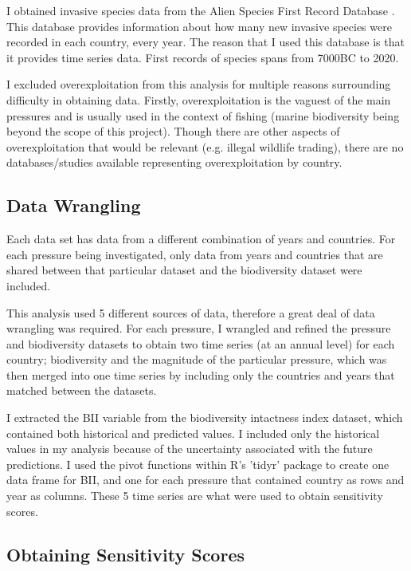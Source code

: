 \documentclass[11pt, a4paper, titlepage]{article}
\begin{document}
	I obtained invasive species data from the Alien Species First Record Database \citep{seebens2017no, seebens2018global}. This database provides information about how many new invasive species were recorded in each country, every year. The reason that I used this database is that it provides time series data. First records of species spans from 7000BC to 2020.  
	
	I excluded overexploitation from this analysis for multiple reasons surrounding difficulty in obtaining data. Firstly, overexploitation is the vaguest of the main pressures and is usually used in the context of fishing (marine biodiversity being beyond the scope of this project). Though there are other aspects of overexploitation that would be relevant (e.g. illegal wildlife trading), there are no databases/studies available representing overexploitation by country.

	\subsection*{Data Wrangling}
	
	Each data set has data from a different combination of years and countries. For each pressure being investigated, only data from years and countries that are shared between that particular dataset and the biodiversity dataset were included. 
	
	This analysis used 5 different sources of data, therefore a great deal of data wrangling was required. For each pressure, I wrangled and refined the pressure and biodiversity datasets to obtain two time series (at an annual level) for each country; biodiversity and the magnitude of the particular pressure, which was then merged into one time series by including only the countries and years that matched between the datasets.
	
	I extracted the BII variable from the biodiversity intactness index dataset, which contained both historical and predicted values. I included only the historical values in my analysis because of the uncertainty associated with the future predictions. I used the pivot functions within R's 'tidyr' package to create one data frame for BII, and one for each pressure that contained country as rows and year as columns. These 5 time series are what were used to obtain sensitivity scores.
	
	\subsection*{Obtaining Sensitivity Scores}
	
\end{document}
